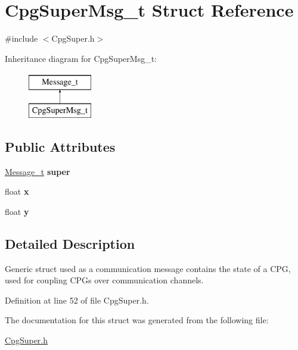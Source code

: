 \hypertarget{structCpgSuperMsg__t}{
\section{CpgSuperMsg\_\-t Struct Reference}
\label{structCpgSuperMsg__t}
}


{\ttfamily \#include $<$CpgSuper.h$>$}

Inheritance diagram for CpgSuperMsg\_\-t:\begin{figure}[H]
\begin{center}
\leavevmode
\includegraphics[height=2.000000cm]{structCpgSuperMsg__t}
\end{center}
\end{figure}
\subsection*{Public Attributes}
\begin{DoxyCompactItemize}
\item 
\hypertarget{structCpgSuperMsg__t_abc825bfe9cb56b73a7b83f84403d893a}{
\hyperlink{structMessage__t}{Message\_\-t} {\bfseries super}}
\label{structCpgSuperMsg__t_abc825bfe9cb56b73a7b83f84403d893a}

\item 
\hypertarget{structCpgSuperMsg__t_a35085a7c4ddb0928ac556a2dcb79a2ec}{
float {\bfseries x}}
\label{structCpgSuperMsg__t_a35085a7c4ddb0928ac556a2dcb79a2ec}

\item 
\hypertarget{structCpgSuperMsg__t_a7e79b693815768cfef98bf449763d83b}{
float {\bfseries y}}
\label{structCpgSuperMsg__t_a7e79b693815768cfef98bf449763d83b}

\end{DoxyCompactItemize}


\subsection{Detailed Description}
Generic struct used as a communication message contains the state of a CPG, used for coupling CPGs over communication channels. 

Definition at line 52 of file CpgSuper.h.



The documentation for this struct was generated from the following file:\begin{DoxyCompactItemize}
\item 
\hyperlink{CpgSuper_8h}{CpgSuper.h}\end{DoxyCompactItemize}
